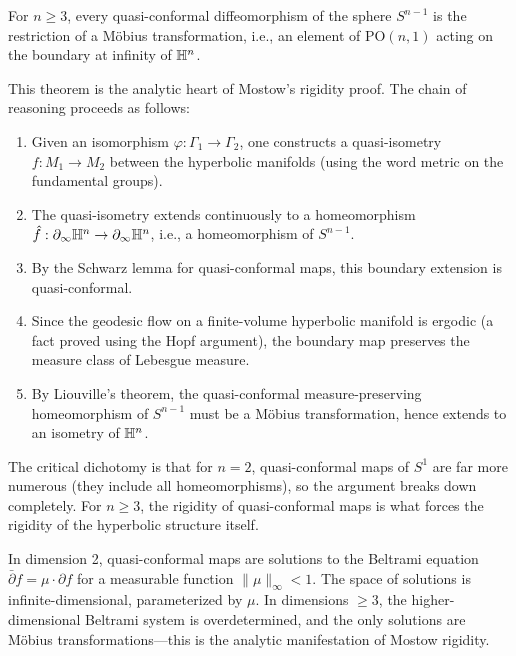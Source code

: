 \begin{theorem}
For $n \geq 3$, every quasi-conformal diffeomorphism of the sphere $S^{n-1}$ is the restriction of a M\"obius transformation, i.e., an element of $\mathrm{PO}(n,1)$ acting on the boundary at infinity of $\mathbb{H}^n$.
\end{theorem}

\begin{remark}
This theorem is the analytic heart of Mostow's rigidity proof. The chain of reasoning proceeds as follows:
\begin{enumerate}
    \item Given an isomorphism $\varphi: \Gamma_1 \to \Gamma_2$, one constructs a quasi-isometry $f: M_1 \to M_2$ between the hyperbolic manifolds (using the word metric on the fundamental groups).
    \item The quasi-isometry extends continuously to a homeomorphism $\hat{f}: \partial_\infty \mathbb{H}^n \to \partial_\infty \mathbb{H}^n$, i.e., a homeomorphism of $S^{n-1}$.
    \item By the Schwarz lemma for quasi-conformal maps, this boundary extension is quasi-conformal.
    \item Since the geodesic flow on a finite-volume hyperbolic manifold is ergodic (a fact proved using the Hopf argument), the boundary map preserves the measure class of Lebesgue measure.
    \item By Liouville's theorem, the quasi-conformal measure-preserving homeomorphism of $S^{n-1}$ must be a M\"obius transformation, hence extends to an isometry of $\mathbb{H}^n$.
\end{enumerate}
The critical dichotomy is that for $n = 2$, quasi-conformal maps of $S^1$ are far more numerous (they include all homeomorphisms), so the argument breaks down completely. For $n \geq 3$, the rigidity of quasi-conformal maps is what forces the rigidity of the hyperbolic structure itself.
\end{remark}

\begin{remark}
In dimension 2, quasi-conformal maps are solutions to the Beltrami equation $\bar\partial f = \mu \cdot \partial f$ for a measurable function $\|\mu\|_\infty < 1$. The space of solutions is infinite-dimensional, parameterized by $\mu$. In dimensions $\geq 3$, the higher-dimensional Beltrami system is overdetermined, and the only solutions are M\"obius transformations---this is the analytic manifestation of Mostow rigidity.
\end{remark}


